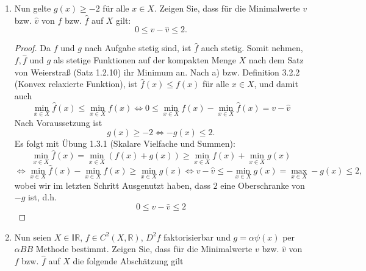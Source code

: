 \documentclass[12pt]{extreport} %
\newcommand{\R}{\mathbb{R}}
\begin{document}
\begin{enumerate}
\begin{proof}
\begin{align*}
			\end{align*} 
			Es gilt außerdem, dass
			$$ \frac{3}{2} x_1^2 \geq f(x) \geq -\frac{1}{2} x_2^2 $$
			für alle $x \in X$, sodass $f(x) \in [-0.5, 1.5]$ und analog $\tilde{g}(x) \in [-0.5, 1.5]$. Somit folgt mit $g \coloneqq g - 1.5$, dass als Verschiebung von $\tilde{g}$ die Funktion $g$ ebenfalls nicht konvex ist, $\hat{f}(x) = f(x) + g(x) = x_1^2 + x_2^2 - 1.5 \leq f(x)$ für alle $x \in X$. Außerdem ist $\hat{f}$ in $C^2(X)$ als Polynom und damit
			$$ D^2 \hat{f} = \begin{pmatrix}
				2 & 0 \\ 0 & 2
			\end{pmatrix} \succ 0 $$
			wodurch $\hat{f}$ nach Satz 2.5.3 ($C^2$-Charakterisierung von Konvexität) konvex ist. Insgesamt erhalten wir eine konvexe Funktion $\hat{f}$ für die $\hat{f}(x) \leq f(x)$ gilt, d.h. $\hat{f}$ ist eine konvexe Relaxierung von $f$.
		\end{proof}
	\item Nun gelte $g(x) \geq -2$ für alle $x \in X$. Zeigen Sie, dass für die Minimalwerte $v$ bzw. $\hat{v}$ von $f$ bzw. $\hat{f}$ auf $X$ gilt:
		$$ 0 \leq v - \hat{v} \leq 2. $$
		\begin{proof}
			Da $f$ und $g$ nach Aufgabe stetig sind, ist $\hat{f}$ auch stetig. Somit nehmen, $f, \hat{f}$ und $g$ als stetige Funktionen auf der kompakten Menge $X$ nach dem Satz von Weierstraß (Satz 1.2.10) ihr Minimum an. Nach a) bzw. Definition 3.2.2 (Konvex relaxierte Funktion), ist $\hat{f}(x) \leq f(x)$ für alle $x \in X$, und damit auch 
			$$ \min_{x \in X} \hat{f}(x) \leq \min_{x \in X} f(x) \iff 0 \leq \min_{x \in X} f(x) - \min_{x \in X} \hat{f}(x) = v - \hat{v}  $$
			Nach Voraussetzung ist 
			$$ g(x) \geq -2 \iff -g(x) \leq 2. $$
			 Es folgt mit Übung 1.3.1 (Skalare Vielfache und Summen):
			$$ \min_{x \in X} \hat{f}(x) = \min_{x \in X} \left( f(x) + g(x) \right) \geq \min_{x \in X} f(x) + \min_{x \in X} g(x)$$
			$$ \iff \min_{x \in X} \hat{f}(x) - \min_{x \in X} f(x) \geq \min_{x \in X} g(x) \iff v - \hat{v} \leq  - \min_{x \in X} g(x) = \max_{x \in X} - g(x) \leq 2, $$
			wobei wir im letzten Schritt Ausgenutzt haben, dass $2$ eine Oberschranke von $-g$ ist, d.h. 
			$$ 0 \leq v - \hat{v} \leq 2 $$
		\end{proof}
	\item Nun seien $X \in \mathbb{IR}$, $f \in C^2(X, \R)$, $D^2 f$ faktorisierbar und $g = \alpha \psi(x)$ per $\alpha BB$ Methode bestimmt. Zeigen Sie, dass für die Minimalwerte $v$ bzw. $\hat{v}$ von $f$ bzw. $\hat{f}$ auf $X$ die folgende Abschätzung gilt

\end{enumerate}
\end{document}
